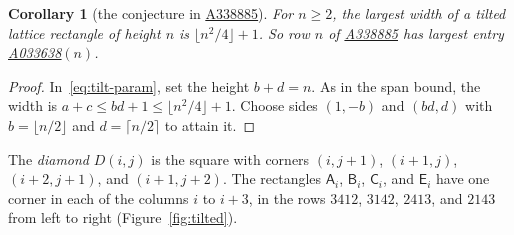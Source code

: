 \documentclass[12pt]{article}
\theoremstyle{plain}
\newtheorem{corollary}[theorem]{Corollary}
\theoremstyle{definition}
\theoremstyle{remark}
\newcommand{\seqnum}[1]{\href{https://oeis.org/#1}{\rm \underline{#1}}}
\newcommand{\kA}{\mathsf{A}}
\newcommand{\kB}{\mathsf{B}}
\newcommand{\kC}{\mathsf{C}}
\newcommand{\kE}{\mathsf{E}}
\begin{document}
\begin{corollary}[the conjecture in \seqnum{A338885}]\label{cor:oeisconj}
For $n\ge2$, the largest width of a tilted lattice rectangle of height $n$ is $\lfloor n^2/4\rfloor+1$. So row $n$ of \seqnum{A338885} has largest entry \seqnum{A033638}$(n)$.
\end{corollary}

\begin{proof}
In~\eqref{eq:tilt-param}, set the height $b+d=n$. As in the span bound,
the width is $a+c\le bd+1\le\lfloor n^2/4\rfloor+1$.
Choose sides $(1,-b)$ and $(bd,d)$ with $b=\lfloor n/2\rfloor$ and
$d=\lceil n/2\rceil$ to attain it.
\end{proof}

The \emph{diamond} $D(i,j)$ is the square with corners $(i,j+1)$, $(i+1,j)$, $(i+2,j+1)$, and $(i+1,j+2)$. The rectangles $\kA_i$, $\kB_i$, $\kC_i$, and $\kE_i$ have one corner in each of the columns $i$ to $i+3$, in the rows $3412$, $3142$, $2413$, and $2143$ from left to right (Figure~\ref{fig:tilted}).
\end{document}

